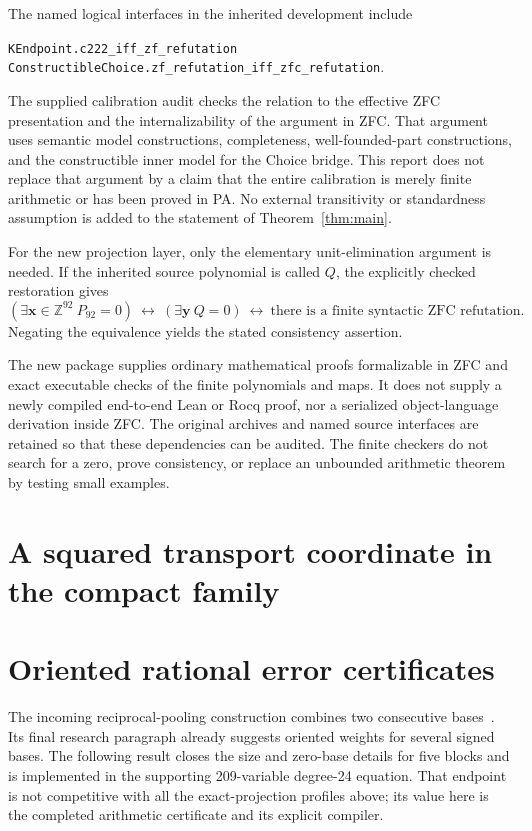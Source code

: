 \documentclass[11pt]{article}
\newcommand{\Z}{\mathbb Z}
\begin{document}
The named logical interfaces in the inherited development include
\begin{center}\small
\texttt{KEndpoint.c222\_iff\_zf\_refutation}\\
\texttt{ConstructibleChoice.zf\_refutation\_iff\_zfc\_refutation}.
\end{center}
The supplied calibration audit checks the relation to the effective
ZFC presentation and the internalizability of the argument in ZFC.
That argument uses semantic model constructions, completeness,
well-founded-part constructions, and the constructible inner model
for the Choice bridge. This report does not replace that argument by
a claim that the entire calibration is merely finite arithmetic or
has been proved in PA. No external transitivity or standardness
assumption is added to the statement of Theorem~\ref{thm:main}.

For the new projection layer, only the elementary unit-elimination
argument is needed. If the inherited source polynomial is called $Q$,
the explicitly checked restoration gives
\[
 (\exists\boldsymbol x\in\Z^{92}\ P_{92}=0)
 \ \longleftrightarrow\
 (\exists\boldsymbol y\ Q=0)
 \ \longleftrightarrow\
 \text{there is a finite syntactic ZFC refutation}.
\]
Negating the equivalence yields the stated consistency assertion.

The new package supplies ordinary mathematical proofs formalizable
in ZFC and exact executable checks of the finite polynomials and maps.
It does not supply a newly compiled end-to-end Lean or Rocq proof,
nor a serialized object-language derivation inside ZFC. The original
archives and named source interfaces are retained so that these
dependencies can be audited. The finite checkers do not search for a
zero, prove consistency, or replace an unbounded arithmetic theorem
by testing small examples.

\section{A squared transport coordinate in the compact family}



\section{Oriented rational error certificates}\label{sec:pooling}

The incoming reciprocal-pooling construction combines two consecutive
bases~\cite{p168}. Its final research paragraph already suggests
oriented weights for several signed bases. The following result closes
the size and zero-base details for five blocks and is implemented in
the supporting 209-variable degree-24 equation. That endpoint is not
competitive with all the exact-projection profiles above; its value
here is the completed arithmetic certificate and its explicit compiler.
\end{document}
